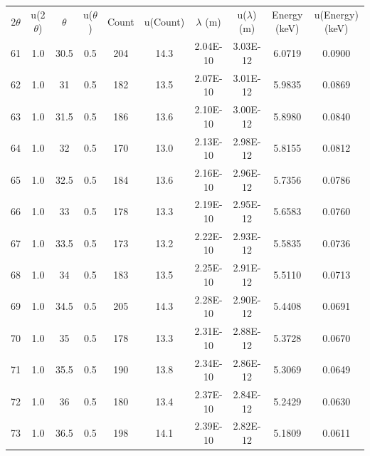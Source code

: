 \documentclass[justified]{tufte-book}
\begin{document}
\begin{table}[ht]
\center
\begin{tabular}{cccccccccc}
\multicolumn{1}{c}{2$\theta$} & \multicolumn{1}{c}{u(2$\theta$)} & \multicolumn{1}{c}{$\theta$} & \multicolumn{1}{c}{u($\theta$)} & \multicolumn{1}{c}{Count} & \multicolumn{1}{c}{u(Count)} & \multicolumn{1}{c}{$\lambda$ (m)} & \multicolumn{1}{c}{u($\lambda$) (m)} & \multicolumn{1}{c}{Energy (keV)} & \multicolumn{1}{c}{u(Energy) (keV)} \\
61          & 1.0   & 30.5       & 0.5           & 204     & 14.3       & 2.04E-10    & 3.03E-12       & 6.0719    & 0.0900       \\
62          & 1.0   & 31         & 0.5           & 182     & 13.5       & 2.07E-10    & 3.01E-12       & 5.9835    & 0.0869       \\
63          & 1.0   & 31.5       & 0.5           & 186     & 13.6       & 2.10E-10    & 3.00E-12       & 5.8980    & 0.0840       \\
64          & 1.0   & 32         & 0.5           & 170     & 13.0       & 2.13E-10    & 2.98E-12       & 5.8155    & 0.0812       \\
65          & 1.0   & 32.5       & 0.5           & 184     & 13.6       & 2.16E-10    & 2.96E-12       & 5.7356    & 0.0786       \\
66          & 1.0   & 33         & 0.5           & 178     & 13.3       & 2.19E-10    & 2.95E-12       & 5.6583    & 0.0760       \\
67          & 1.0   & 33.5       & 0.5           & 173     & 13.2       & 2.22E-10    & 2.93E-12       & 5.5835    & 0.0736       \\
68          & 1.0   & 34         & 0.5           & 183     & 13.5       & 2.25E-10    & 2.91E-12       & 5.5110    & 0.0713       \\
69          & 1.0   & 34.5       & 0.5           & 205     & 14.3       & 2.28E-10    & 2.90E-12       & 5.4408    & 0.0691       \\
70          & 1.0   & 35         & 0.5           & 178     & 13.3       & 2.31E-10    & 2.88E-12       & 5.3728    & 0.0670       \\
71          & 1.0   & 35.5       & 0.5           & 190     & 13.8       & 2.34E-10    & 2.86E-12       & 5.3069    & 0.0649       \\
72          & 1.0   & 36         & 0.5           & 180     & 13.4       & 2.37E-10    & 2.84E-12       & 5.2429    & 0.0630       \\
73          & 1.0   & 36.5       & 0.5           & 198     & 14.1       & 2.39E-10    & 2.82E-12       & 5.1809    & 0.0611       \\

\end{tabular}
\end{table}
\end{document}
